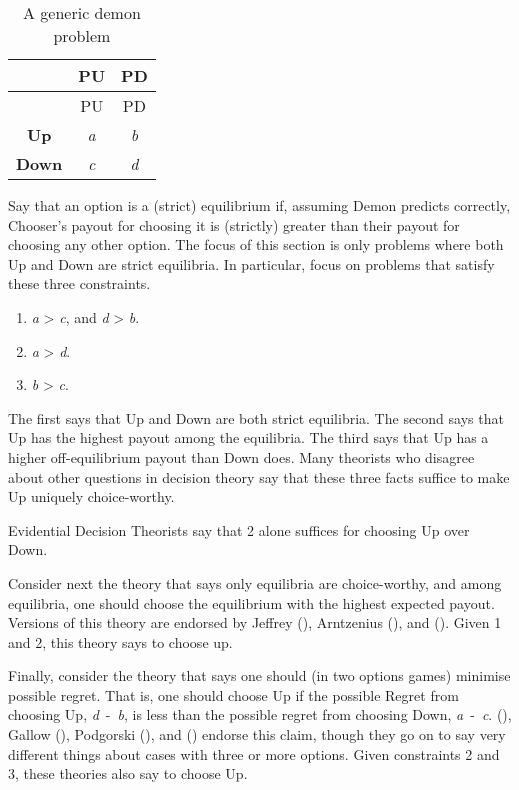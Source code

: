 \documentclass[
  10pt,
  letterpaper,
  DIV=11,
  numbers=noendperiod,
  twoside]{scrartcl}
\providecommand{\tightlist}{%
  \setlength{\itemsep}{0pt}\setlength{\parskip}{0pt}}\usepackage{longtable,booktabs,array}
\begin{document}
\begin{longtable}[]{@{}ccc@{}}
\caption{A generic demon
problem}\label{tbl-generic-demon}\tabularnewline
\toprule\noalign{}
& PU & PD \\
\midrule\noalign{}
\endfirsthead
\toprule\noalign{}
& PU & PD \\
\midrule\noalign{}
\endhead
\bottomrule\noalign{}
\endlastfoot
\textbf{Up} & \emph{a} & \emph{b} \\
\textbf{Down} & \emph{c} & \emph{d} \\
\end{longtable}

Say that an option is a (strict) equilibrium if, assuming Demon predicts
correctly, Chooser's payout for choosing it is (strictly) greater than
their payout for choosing any other option. The focus of this section is
only problems where both Up and Down are strict equilibria. In
particular, focus on problems that satisfy these three constraints.

\begin{enumerate}
\def\labelenumi{\arabic{enumi}.}
\tightlist
\item
  \emph{a} \textgreater{} \emph{c}, and \emph{d} \textgreater{}
  \emph{b}.
\item
  \emph{a} \textgreater{} \emph{d}.
\item
  \emph{b} \textgreater{} \emph{c}.
\end{enumerate}

The first says that Up and Down are both strict equilibria. The second
says that Up has the highest payout among the equilibria. The third says
that Up has a higher off-equilibrium payout than Down does. Many
theorists who disagree about other questions in decision theory say that
these three facts suffice to make Up uniquely choice-worthy.

Evidential Decision Theorists say that 2 alone suffices for choosing Up
over Down.

Consider next the theory that says only equilibria are choice-worthy,
and among equilibria, one should choose the equilibrium with the highest
expected payout. Versions of this theory are endorsed by Jeffrey
(), Arntzenius
(), and
(). Given 1 and 2,
this theory says to choose up.

Finally, consider the theory that says one should (in two options games)
minimise possible regret. That is, one should choose Up if the possible
Regret from choosing Up, \emph{d}~-~\emph{b}, is less than the possible
regret from choosing Down, \emph{a}~-~\emph{c}.
(), Gallow
(), Podgorski
(), and
() endorse this claim,
though they go on to say very different things about cases with three or
more options. Given constraints 2 and 3, these theories also say to
choose Up.
\end{document}
